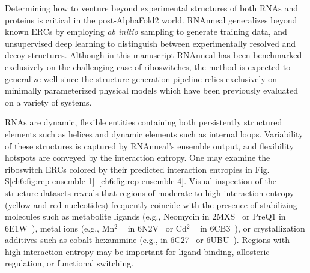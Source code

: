 Determining how to venture beyond experimental structures of both RNAs and proteins is critical in the post-AlphaFold2 world. RNAnneal generalizes beyond known ERCs by employing {\it ab initio} sampling to generate training data, and unsupervised deep learning to distinguish between experimentally resolved and decoy structures. Although in this manuscript RNAnneal has been benchmarked exclusively on the challenging case of riboswitches, the method is expected to generalize well since the structure generation pipeline relies exclusively on minimally parameterized physical models which have been previously evaluated on a variety of systems.~\cite{watkins2020farfar2,DE-Shaw-RNA-ff}

RNAs are dynamic, flexible entities containing both persistently structured elements such as helices and dynamic elements such as internal loops. Variability of these structures is captured by RNAnneal's ensemble output, and flexibility hotspots are conveyed by the interaction entropy. One may examine the riboswitch ERCs colored by their predicted interaction entropies in Fig. S\ref{ch6:fig:rep-ensemble-1}–\ref{ch6:fig:rep-ensemble-4}. Visual inspection of the structure datasets reveals that regions of moderate-to-high interaction entropy (yellow and red nucleotides) frequently coincide with the presence of stabilizing molecules such as metabolite ligands (e.g., Neomycin in 2MXS~\cite{Schmidtke2015} or PreQ1 in 6E1W~\cite{Numata2019}), metal ions (e.g., Mn$^{2+}$ in 6N2V~\cite{Price2018} or Cd$^{2+}$ in 6CB3~\cite{Bachas2018}), or crystallization additives such as cobalt hexammine (e.g., in 6C27~\cite{Grigg2018} or 6UBU~\cite{Matyjasik2019}). Regions with high interaction entropy may be important for ligand binding, allosteric regulation, or functional switching.

